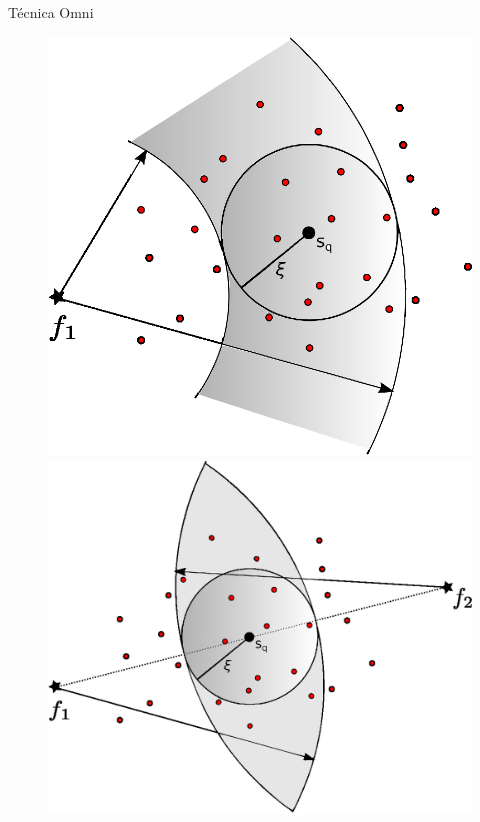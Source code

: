 \documentclass{beamer}
\begin{document}
\begin{frame}{Técnica Omni}

	\begin{figure}
	    \centering
	    \begin{minipage}{.5\textwidth}
	      \centering
	      \includegraphics[width=.9\linewidth]{rg_omni_1.eps}


	    \end{minipage}%
	    \begin{minipage}{.5\textwidth}
	      \centering
	      \includegraphics[width=.9\linewidth]{rg_omni_2.eps}


	    \end{minipage}
	\end{figure}
 
\end{frame}
\end{document}
